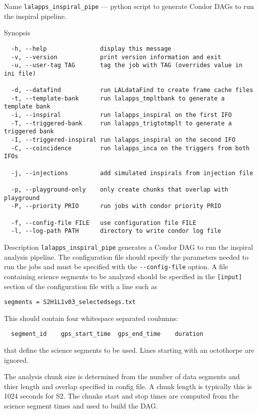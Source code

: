 \begin{entry}
\item[Name]
\verb$lalapps_inspiral_pipe$ --- python script to generate Condor DAGs to
run the inspiral pipeline.

\item[Synopsis]
\begin{verbatim}
  -h, --help               display this message
  -v, --version            print version information and exit
  -u, --user-tag TAG       tag the job with TAG (overrides value in ini file)

  -d, --datafind           run LALdataFind to create frame cache files
  -t, --template-bank      run lalapps_tmpltbank to generate a template bank
  -i, --inspiral           run lalapps_inspiral on the first IFO
  -T, --triggered-bank     run lalapps_trigtotmplt to generate a triggered bank
  -I, --triggered-inspiral run lalapps_inspiral on the second IFO
  -C, --coincidence        run lalapps_inca on the triggers from both IFOs

  -j, --injections         add simulated inspirals from injection file

  -p, --playground-only    only create chunks that overlap with playground
  -P, --priority PRIO      run jobs with condor priority PRIO

  -f, --config-file FILE   use configuration file FILE
  -l, --log-path PATH      directory to write condor log file
\end{verbatim}

\item[Description] \verb$lalapps_inspiral_pipe$ generates a Condor DAG to run
the inspiral analysis pipeline. The configuration file should specify the
parameters needed to run the jobs and must be specified with the
\verb$--config-file$ option.  A file containing science segments to be
analyzed should be specified in the \verb$[input]$ section of the
configuration file with a line such as
\begin{verbatim}
segments = S2H1L1v03_selectedsegs.txt
\end{verbatim}
This should contain four whitespace separated coulumns:
\begin{verbatim}
  segment_id    gps_start_time  gps_end_time    duration
\end{verbatim}
that define the science segments to be used. Lines starting with an octothorpe
are ignored.

The analysis chunk size is determined from the number of data segments and
thier length and overlap specified in config file. A chunk length is typically
this is 1024 seconds for S2.  The chunks start and stop times are computed
from the science segment times and used to build the DAG.


\end{entry}
